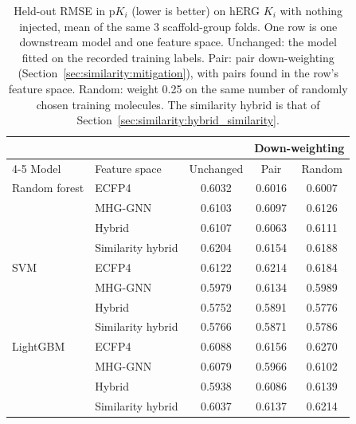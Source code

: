 \begin{table}[htbp]
\centering
\small
\begin{tabular}{@{}llccc@{}}
\toprule
 & & & \multicolumn{2}{c}{Down-weighting} \\
\cmidrule(l){4-5}
Model & Feature space & Unchanged & Pair & Random \\
\midrule
Random forest & ECFP4 & 0.6032 & 0.6016 & 0.6007 \\
 & MHG-GNN & 0.6103 & 0.6097 & 0.6126 \\
 & Hybrid & 0.6107 & 0.6063 & 0.6111 \\
 & Similarity hybrid & 0.6204 & 0.6154 & 0.6188 \\
\addlinespace
SVM & ECFP4 & 0.6122 & 0.6214 & 0.6184 \\
 & MHG-GNN & 0.5979 & 0.6134 & 0.5989 \\
 & Hybrid & 0.5752 & 0.5891 & 0.5776 \\
 & Similarity hybrid & 0.5766 & 0.5871 & 0.5786 \\
\addlinespace
LightGBM & ECFP4 & 0.6088 & 0.6156 & 0.6270 \\
 & MHG-GNN & 0.6079 & 0.5966 & 0.6102 \\
 & Hybrid & 0.5938 & 0.6086 & 0.6139 \\
 & Similarity hybrid & 0.6037 & 0.6137 & 0.6214 \\
\bottomrule
\end{tabular}
\caption[Pair down-weighting on the recorded hERG $K_i$ labels]{Held-out RMSE in p$K_i$ (lower is better) on hERG $K_i$ with nothing injected, mean of the same 3 scaffold-group folds. One row is one downstream model and one feature space. Unchanged: the model fitted on the recorded training labels. Pair: pair down-weighting (Section~\ref{sec:similarity:mitigation}), with pairs found in the row's feature space. Random: weight 0.25 on the same number of randomly chosen training molecules. The similarity hybrid is that of Section~\ref{sec:similarity:hybrid_similarity}.}
\label{tab:ch6prelim_level0}
\end{table}

